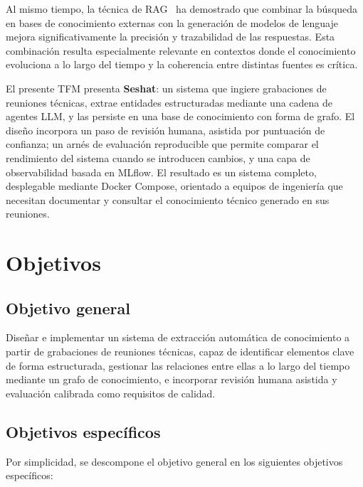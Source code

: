 Al mismo tiempo, la técnica de \ac{RAG}~\cite{lewis2020rag} ha demostrado que combinar la
búsqueda en bases de conocimiento externas con la generación de modelos de lenguaje mejora
significativamente la precisión y trazabilidad de las respuestas. Esta combinación resulta
especialmente relevante en contextos donde el conocimiento evoluciona a lo largo del tiempo y
la coherencia entre distintas fuentes es crítica.

El presente \ac{TFM} presenta \textbf{Seshat}: un sistema que ingiere grabaciones de reuniones
técnicas, extrae entidades estructuradas mediante una cadena de agentes LLM, y las persiste en
una base de conocimiento con forma de grafo. El diseño incorpora un paso de revisión humana,
asistida por puntuación de confianza; un arnés de evaluación reproducible que permite comparar
el rendimiento del sistema cuando se introducen cambios, y una capa de observabilidad basada en
MLflow. El resultado es un sistema completo, desplegable mediante Docker Compose, orientado a
equipos de ingeniería que necesitan documentar y consultar el conocimiento técnico generado en
sus reuniones.

\section{Objetivos}

\subsection{Objetivo general}

Diseñar e implementar un sistema de extracción automática de conocimiento a partir de grabaciones
de reuniones técnicas, capaz de identificar elementos clave de forma estructurada, gestionar las
relaciones entre ellas a lo largo del tiempo mediante un grafo de conocimiento, e incorporar revisión
humana asistida y evaluación calibrada como requisitos de calidad.

\subsection{Objetivos específicos}

Por simplicidad, se descompone el objetivo general en los siguientes objetivos específicos:


